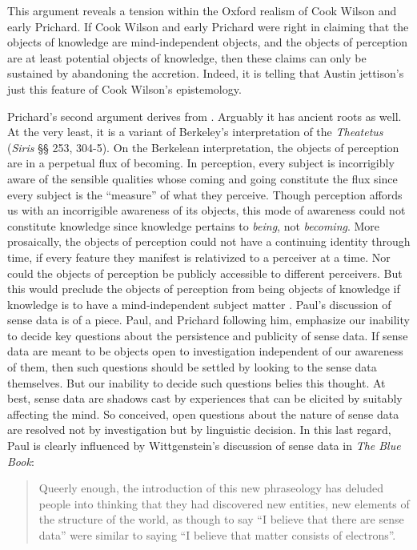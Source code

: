 \documentclass[11pt]{article}
\begin{document}
This argument reveals a tension within the Oxford realism of Cook Wilson and early Prichard. If Cook Wilson and early Prichard were right in claiming that the objects of knowledge are mind-independent objects, and the objects of perception are at least potential objects of knowledge, then these claims can only be sustained by abandoning the accretion. Indeed, it is telling that Austin jettison's just this feature of Cook Wilson's epistemology.

Prichard's second argument derives from \citet{Paul:1936kd}. Arguably it has ancient roots as well. At the very least, it is a variant of Berkeley's interpretation of the \emph{Theatetus} (\emph{Siris} §§ 253, 304-5). On the Berkelean interpretation, the objects of perception are in a perpetual flux of becoming. In perception, every subject is incorrigibly aware of the sensible qualities whose coming and going constitute the flux since every subject is the ``measure'' of what they perceive. Though perception affords us with an incorrigible awareness of its objects, this mode of awareness could not constitute knowledge since knowledge pertains to \emph{being}, not \emph{becoming}. More prosaically, the objects of perception could not have a continuing identity through time, if every feature they manifest is relativized to a perceiver at a time. Nor could the objects of perception be publicly accessible to different perceivers. But this would preclude the objects of perception from being objects of knowledge if knowledge is to have a mind-independent subject matter \citep[see][for further diiscussion of the Berkelean interpretation]{Burnyeat:1990dp}. Paul's discussion of sense data is of a piece. Paul, and Prichard following him, emphasize our inability to decide key questions about the persistence and publicity of sense data. If sense data are meant to be objects open to investigation independent of our awareness of them, then such questions should be settled by looking to the sense data themselves. But our inability to decide such questions belies this thought. At best, sense data are shadows cast by experiences that can be elicited by suitably affecting the mind. So conceived, open questions about the nature of sense data are resolved not by investigation but by linguistic decision. In this last regard, Paul is clearly influenced by Wittgenstein's discussion of sense data in \emph{The Blue Book}:
\begin{quote}
    Queerly enough, the introduction of this new phraseology has deluded people into thinking that they had discovered new entities, new elements of the structure of the world, as though to say “I believe that there are sense data” were similar to saying “I believe that matter consists of electrons”. \citep[70]{Wittgenstein:1958rr}
\end{quote}
\end{document}
